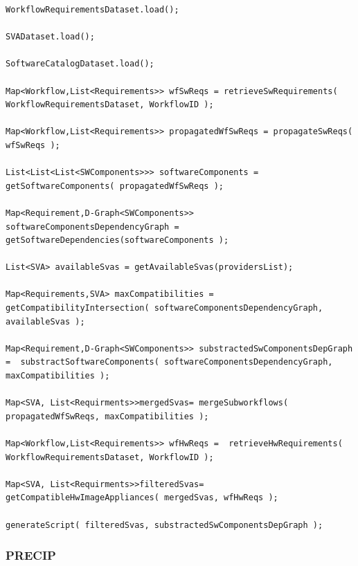 \begin{lstlisting}[caption={Pseudo-code overview of the Infrastructure Specification Algorithm (ISA).},label={lst:pseudo},basicstyle=\footnotesize]
WorkflowRequirementsDataset.load();

SVADataset.load();

SoftwareCatalogDataset.load();

Map<Workflow,List<Requirements>> wfSwReqs = retrieveSwRequirements( WorkflowRequirementsDataset, WorkflowID );

Map<Workflow,List<Requirements>> propagatedWfSwReqs = propagateSwReqs( wfSwReqs );

List<List<List<SWComponents>>> softwareComponents = getSoftwareComponents( propagatedWfSwReqs );

Map<Requirement,D-Graph<SWComponents>> softwareComponentsDependencyGraph =    getSoftwareDependencies(softwareComponents );

List<SVA> availableSvas = getAvailableSvas(providersList);

Map<Requirements,SVA> maxCompatibilities = getCompatibilityIntersection( softwareComponentsDependencyGraph, availableSvas );

Map<Requirement,D-Graph<SWComponents>> substractedSwComponentsDepGraph =  substractSoftwareComponents( softwareComponentsDependencyGraph, maxCompatibilities );

Map<SVA, List<Requirments>>mergedSvas= mergeSubworkflows( propagatedWfSwReqs, maxCompatibilities );

Map<Workflow,List<Requirements>> wfHwReqs =  retrieveHwRequirements( WorkflowRequirementsDataset, WorkflowID );

Map<SVA, List<Requirments>>filteredSvas= getCompatibleHwImageAppliances( mergedSvas, wfHwReqs );

generateScript( filteredSvas, substractedSwComponentsDepGraph );
\end{lstlisting}



\subsubsection{PRECIP}


